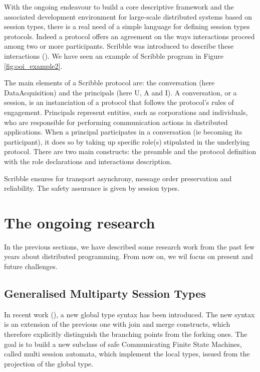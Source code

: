 \documentclass{article}
\begin{document}
With the ongoing endeavour to build a core descriptive framework and the associated development environment for large-scale distributed systems based on session types, there is a real need of a simple language for defining session types protocols. Indeed a protocol offers an agreement on the ways interactions proceed among two or more participants. Scribble was introduced to describe these interactions (\cite{honda2011scribbling}). We have seen an example of Scribble program in Figure \ref{fig:ooi_example2}.

The main elements of a Scribble protocol are: the conversation (here DataAcquisition) and the principals (here U, A and I). A conversation, or a session, is an instanciation of a protocol that follows the protocol's rules of engagement. Principals represent entities, such as corporations and individuals, who are responsible for performing communication actions in distributed applications. When a principal participates in a conversation (ie becoming its participant), it does so by taking up specific role(s) stipulated in the underlying protocol. There are two main constructs: the preamble and the protocol definition with the role declarations and interactions description.

Scribble ensures for transport asynchrony, message order preservation and reliability. The safety assurance is given by session types.

\section{The ongoing research}

In the previous sections, we have described some research work from the past few years about distributed programming. From now on, we wil focus on present and future challenges.

\subsection{Generalised Multiparty Session Types}

In recent work (\cite{denielou2012multiparty}), a new global type syntax has been introduced. The new syntax is an extension of the previous one with join and merge constructs, which therefore explicitly distinguish the branching points from the forking ones. The goal is to build a new subclass of safe Communicating Finite State Machines, called multi session automata, which implement the local types, issued from the projection of the global type. 
\end{document}
